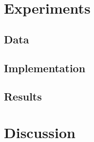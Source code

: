 \documentclass{article}
\begin{document}

\section{Experiments}

\subsection{Data}

\subsection{Implementation}

\subsection{Results}

\section{Discussion}


\end{document}
